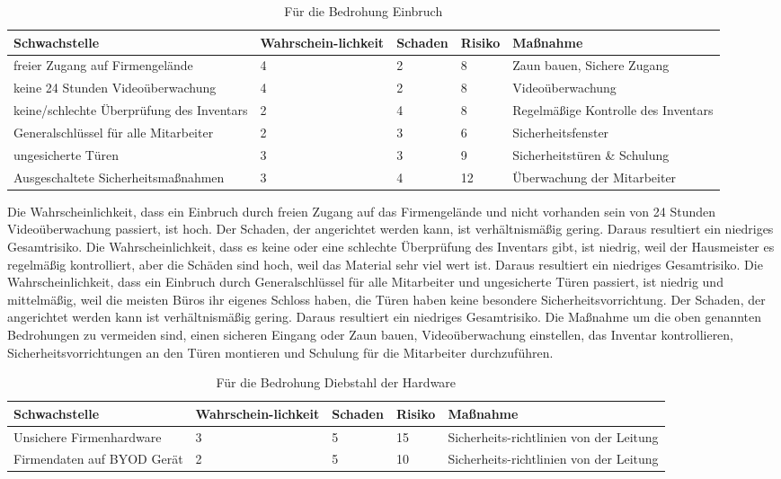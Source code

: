 \begin{table}[H]
\caption{Für die Bedrohung Einbruch}
\begin{tabu} to \linewidth {X[-1,l,m] X[-1,l,m] X[-1,l,m] X[-1,l,m] X[-1,l,m] }
\toprule 
\textbf{Schwachstelle} & \textbf{Wahrschein-\linebreak{}lichkeit} & \textbf{Schaden} & \textbf{Risiko} & \textbf{Maßnahme}\tabularnewline
\midrule 
freier Zugang auf Firmengelände & 4 & 2 & 8 & Zaun bauen, Sichere Zugang\tabularnewline
keine 24 Stunden Videoüberwachung & 4 & 2 & 8 & Videoüberwachung\tabularnewline
keine/schlechte Überprüfung des Inventars & 2 & 4 & 8 & Regelmäßige Kontrolle des Inventars\tabularnewline
Generalschlüssel für alle Mitarbeiter & 2 & 3 & 6 & Sicherheitsfenster\tabularnewline
ungesicherte Türen & 3 & 3 & 9 & Sicherheitstüren \& Schulung\tabularnewline
Ausgeschaltete Sicherheitsmaßnahmen & 3 & 4 & 12 & Überwachung der Mitarbeiter\tabularnewline
\bottomrule 
\end{tabu}
\end{table}

Die Wahrscheinlichkeit, dass ein Einbruch durch freien Zugang auf das Firmengelände und nicht vorhanden sein von 24 Stunden Videoüberwachung passiert, ist hoch. Der Schaden, der angerichtet werden kann, ist verhältnismäßig gering. Daraus resultiert ein niedriges Gesamtrisiko.
Die Wahrscheinlichkeit, dass es keine oder eine schlechte Überprüfung des Inventars gibt, ist niedrig, weil der Hausmeister es regelmäßig kontrolliert, aber die Schäden sind hoch, weil das Material sehr viel wert ist. Daraus resultiert ein niedriges Gesamtrisiko.
Die Wahrscheinlichkeit, dass ein Einbruch durch Generalschlüssel für alle Mitarbeiter und  ungesicherte Türen passiert, ist niedrig und mittelmäßig, weil die meisten Büros ihr eigenes Schloss haben, die Türen haben keine besondere Sicherheitsvorrichtung. Der Schaden, der angerichtet werden kann ist verhältnismäßig gering. Daraus resultiert ein niedriges Gesamtrisiko.
Die Maßnahme um die oben genannten Bedrohungen zu vermeiden sind, einen sicheren Eingang oder Zaun bauen, Videoüberwachung einstellen, das Inventar kontrollieren, Sicherheitsvorrichtungen an den Türen montieren und Schulung für die Mitarbeiter durchzuführen.

\begin{table}[H]
\caption{Für die Bedrohung Diebstahl der Hardware}
\begin{tabu} to \linewidth {X[-1,l,m] X[-1,l,m] X[-1,l,m] X[-1,l,m] X[-1,l,m] }
\toprule 
\textbf{Schwachstelle} & \textbf{Wahrschein-\linebreak{}lichkeit} & \textbf{Schaden} & \textbf{Risiko} & \textbf{Maßnahme}\tabularnewline
\midrule 
Unsichere Firmenhardware & 3 & 5 & 15 & Sicherheits-\linebreak{}richtlinien von der Leitung\tabularnewline
Firmendaten auf BYOD Gerät & 2 & 5 & 10 & Sicherheits-\linebreak{}richtlinien von der Leitung\tabularnewline
\bottomrule 
\end{tabu}
\end{table}

